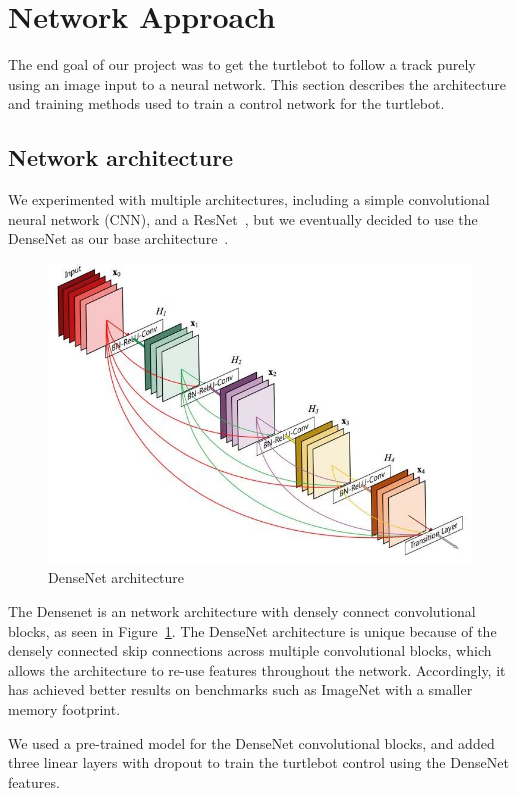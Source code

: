 \section{Network Approach}
\label{sec:network}
The end goal of our project was to get the turtlebot to follow a track purely using an image input to a neural network.
This section describes the architecture and training methods used to train a control network for the turtlebot.

\subsection{Network architecture}
We experimented with multiple architectures, including a simple convolutional neural network (CNN), and a ResNet~\cite{ResNet}, but we eventually decided to use the DenseNet as our base architecture~\cite{DenseNet}.

\begin{figure}[hbt]
  \includegraphics[width=\columnwidth]{figures/densenet}
  \caption{DenseNet architecture}
  \label{fig:densenet}
\end{figure}

The Densenet is an network architecture with densely connect convolutional blocks, as seen in Figure~\ref{fig:densenet}. The DenseNet architecture is unique because of the densely connected skip connections across multiple convolutional blocks, which allows the architecture to re-use features throughout the network. Accordingly, it has achieved better results on benchmarks such as ImageNet with a smaller memory footprint.

We used a pre-trained model for the DenseNet convolutional blocks, and added three linear layers with dropout to train the turtlebot control using the DenseNet features.

